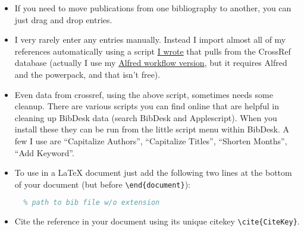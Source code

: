 \begin{itemize}
\begin{itemize}
\end{itemize}
\item If you need to move publications from one bibliography to another, you can just drag and drop entries.
\item I very rarely enter any entries manually. Instead I import almost all of my references automatically using a script \href{https://github.com/byuflowlab/bibteximport}{I wrote} that pulls from the CrossRef database (actually I use my \href{https://github.com/andrewning/alfred-workflows-scientific}{Alfred workflow version}, but it requires Alfred and the powerpack, and that isn't free).
\item Even data from crossref, using the above script, sometimes needs some cleanup.  There are various scripts you can find online that are helpful in cleaning up BibDesk data (search BibDesk and Applescript).  When you install these they can be run from the little script menu within BibDesk.  A few I use are ``Capitalize Authors'', ``Capitalize Titles'', ``Shorten Months'', ``Add Keyword''.
\item To use in a LaTeX document just add the following two lines at the bottom of your document (but before \texttt{\textbackslash end\{document\}}):

\begin{lstlisting}[language=tex]
  % depending on journal style
  % path to bib file w/o extension
\end{lstlisting}

\item Cite the reference in your document using its unique citekey \texttt{\textbackslash cite\{CiteKey\}}. 
\end{itemize}

